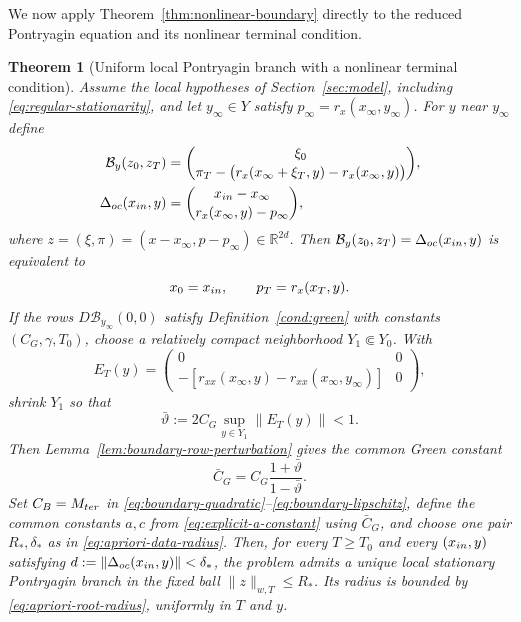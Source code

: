 \documentclass[twocolumn,nameyear,amsthm]{autart}
\newcommand{\R}{\mathbb R}
\newcommand{\B}{\mathcal B}
\newcommand{\xinf}{x_\infty}
\newcommand{\pinf}{p_\infty}
\numberwithin{equation}{section}
\newtheorem{theorem}{Theorem}[section]
\begin{document}
We now apply Theorem~\ref{thm:nonlinear-boundary} directly to the reduced
Pontryagin equation and its nonlinear terminal condition.


\begin{theorem}[Uniform local Pontryagin branch with a nonlinear terminal condition]\label{thm:main}
Assume the local hypotheses of Section~\ref{sec:model}, including
\eqref{eq:regular-stationarity}, and let
$y_\infty\in Y$ satisfy $\pinf=r_x(\xinf,y_\infty)$.  For $y$ near
$y_\infty$ define
\[
\begin{aligned}
   \B_y(z_0,z_T)&=
   \binom{\xi_0}
         {\pi_T-\bigl(r_x(\xinf+\xi_T,y)-r_x(\xinf,y)\bigr)},\\
   \Delta_{\rm oc}(x_{\rm in},y)&=
   \binom{x_{\rm in}-\xinf}{r_x(\xinf,y)-\pinf},
\end{aligned}
\]
where $z=(\xi,\pi)=(x-\xinf,p-\pinf)\in\R^{2d}$.  Then
$\B_y(z_0,z_T)=\Delta_{\rm oc}(x_{\rm in},y)$ is equivalent to
\[
        x_0=x_{\rm in},\qquad p_T=r_x(x_T,y).
\]
If the rows $D\B_{y_\infty}(0,0)$ satisfy Definition~\ref{cond:green} with
constants $(C_G,\gamma,T_0)$, choose a relatively compact neighborhood
$Y_1\Subset Y_0$.  With
\[
 E_T(y)=\begin{pmatrix}
 0&0\\-[r_{xx}(\xinf,y)-r_{xx}(\xinf,y_\infty)]&0
 \end{pmatrix},
\]
shrink $Y_1$ so that
\begin{equation}\label{eq:y-row-margin}
 \bar\vartheta:=2C_G\sup_{y\in Y_1}
 \|E_T(y)\|<1.
\end{equation}
Then Lemma~\ref{lem:boundary-row-perturbation} gives the common
Green constant
\begin{equation}\label{eq:y-common-green}
 \bar C_G=C_G\frac{1+\bar\vartheta}{1-\bar\vartheta}.
\end{equation}
Set $C_B=M_{\rm ter}$ in
\eqref{eq:boundary-quadratic}--\eqref{eq:boundary-lipschitz}, define the
common constants $a,c$ from \eqref{eq:explicit-a-constant} using
$\bar C_G$, and choose one pair $R_*,\delta_*$ as in
\eqref{eq:apriori-data-radius}.  Then, for every $T\ge T_0$ and every
$(x_{\rm in},y)$ satisfying
$d:=\|\Delta_{\rm oc}(x_{\rm in},y)\|<\delta_*$, the problem admits a unique local
stationary Pontryagin branch in the fixed ball $\|z\|_{w,T}\le R_*$.  Its
radius is bounded by \eqref{eq:apriori-root-radius}, uniformly in $T$ and
$y$.


\end{theorem}
\end{document}
